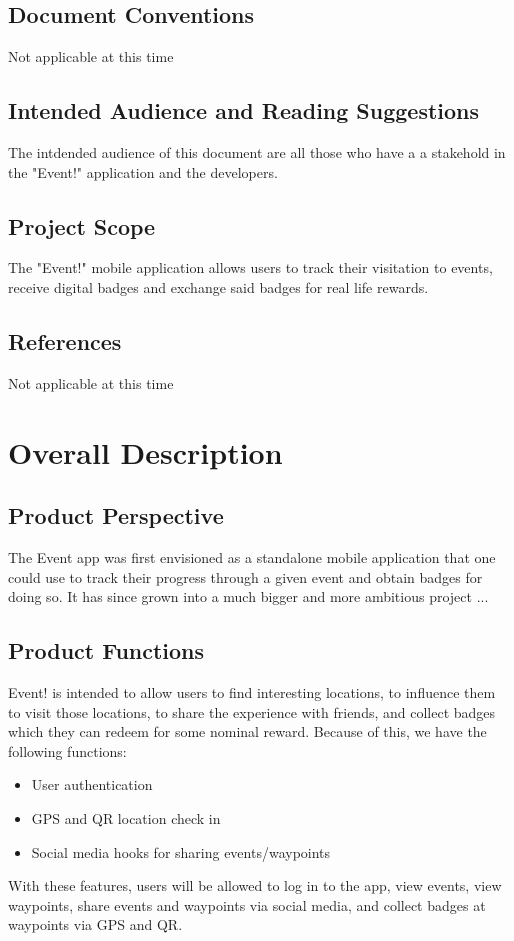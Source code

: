 \documentclass{scrreprt}
\begin{document}
\section{Document Conventions}
Not applicable at this time

\section{Intended Audience and Reading Suggestions}
The intdended audience of this document are all those who have a a stakehold in
the "Event!" application and the developers.

\section{Project Scope}
The "Event!" mobile application allows users to track their visitation to events,
receive digital badges and exchange said badges for real life rewards.

\section{References}
Not applicable at this time

\chapter{Overall Description}

\section{Product Perspective}
The Event app was first envisioned as a standalone mobile application that one
could use to track their progress through a given event and obtain badges for doing so.
It has since grown into a much bigger and more ambitious project ...

\section{Product Functions}
Event! is intended to allow users to find interesting locations, to influence them 
to visit those locations, to share the experience with friends, and collect badges 
which they can redeem for some nominal reward. Because of this, we have the 
following functions: 
\begin{itemize}
\item User authentication
\item GPS and QR location check in
\item Social media hooks for sharing events/waypoints
\end{itemize}
With these features, users will be allowed to log in to the app, view events, 
view waypoints, share events and waypoints via social media, and collect 
badges at waypoints via GPS and QR.
\end{document}
